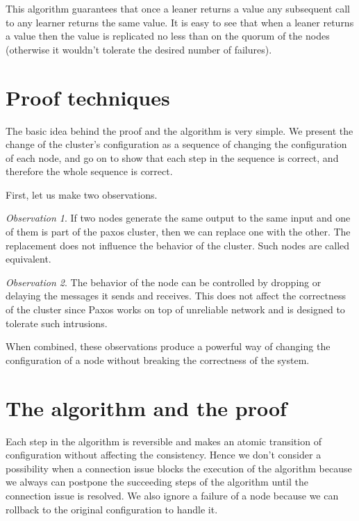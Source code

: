 \documentclass[12pt]{article}
\begin{document}
This algorithm guarantees that once a leaner returns a value any subsequent call to any learner returns the same value. It is easy to see that when a leaner returns a value then the value is replicated no less than on the quorum of the nodes (otherwise it wouldn't tolerate the desired number of failures).

\section{Proof techniques}

The basic idea behind the proof and the algorithm is very simple. We present the change of the cluster's configuration as a sequence of changing the configuration of each node, and go on to show that each step in the sequence is correct, and therefore the whole sequence is correct.

First, let us make two observations.

\medskip

{\it Observation 1}. If two nodes generate the same output to the same input and one of them is part of the paxos cluster, then we can replace one with the other. The replacement does not influence the behavior of the cluster. Such nodes are called equivalent.

\smallskip

{\it Observation 2}. The behavior of the node can be controlled by dropping or delaying the messages it sends and receives. This does not affect the correctness of the cluster since Paxos works on top of unreliable network and is designed to tolerate such intrusions.

\medskip

When combined, these observations produce a powerful way of changing the configuration of a node without breaking the correctness of the system.

\section{The algorithm and the proof}

Each step in the algorithm is reversible and makes an atomic transition of configuration without affecting the consistency. Hence we don't consider a possibility when a connection issue blocks the execution of the algorithm because we always can postpone the succeeding steps of the algorithm until the connection issue is resolved. We also ignore a failure of a node because we can rollback to the original configuration to handle it.
\end{document}
